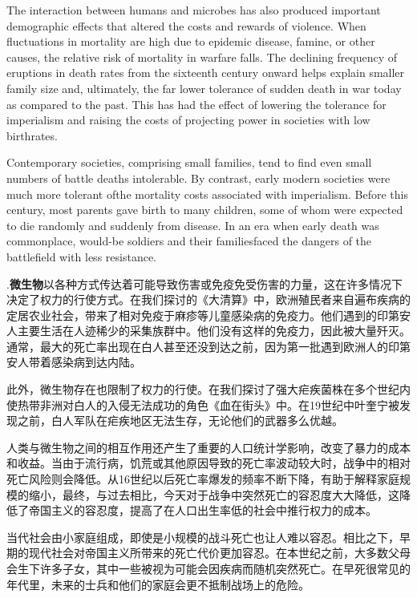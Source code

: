 \begin{paracol}{2}
The interaction between humans and microbes has also produced important demographic effects that altered the costs and rewards of violence. When fluctuations in mortality are high due to epidemic disease, famine, or other causes, the relative risk of mortality in warfare falls. The declining frequency of eruptions in death rates from the sixteenth century onward helps explain smaller family size and, ultimately, the far lower tolerance of sudden death in war today as compared to the past. This has had the effect of lowering the tolerance for imperialism and raising the costs of projecting power in societies with low birthrates.

Contemporary societies, comprising small families, tend to find even small numbers of battle deaths intolerable. By contrast, early modern societies were much more tolerant ofthe mortality costs associated with imperialism. Before this century, most parents gave birth to many children, some of whom were expected to die randomly and suddenly from disease. In an era when early death was commonplace, would-be soldiers and their familiesfaced the dangers of the battlefield with less resistance.

.\textbf{微生物}以各种方式传达着可能导致伤害或免疫免受伤害的力量，这在许多情况下决定了权力的行使方式。在我们探讨的《大清算》中，欧洲殖民者来自遍布疾病的定居农业社会，带来了相对免疫于麻疹等儿童感染病的免疫力。他们遇到的印第安人主要生活在人迹稀少的采集族群中。他们没有这样的免疫力，因此被大量歼灭。通常，最大的死亡率出现在白人甚至还没到达之前，因为第一批遇到欧洲人的印第安人带着感染病到达内陆。

此外，微生物存在也限制了权力的行使。在我们探讨了强大疟疾菌株在多个世纪内使热带非洲对白人的入侵无法成功的角色《血在街头》中。在19世纪中叶奎宁被发现之前，白人军队在疟疾地区无法生存，无论他们的武器多么优越。

人类与微生物之间的相互作用还产生了重要的人口统计学影响，改变了暴力的成本和收益。当由于流行病，饥荒或其他原因导致的死亡率波动较大时，战争中的相对死亡风险则会降低。从16世纪以后死亡率爆发的频率不断下降，有助于解释家庭规模的缩小，最终，与过去相比，今天对于战争中突然死亡的容忍度大大降低，这降低了帝国主义的容忍度，提高了在人口出生率低的社会中推行权力的成本。

当代社会由小家庭组成，即使是小规模的战斗死亡也让人难以容忍。相比之下，早期的现代社会对帝国主义所带来的死亡代价更加容忍。在本世纪之前，大多数父母会生下许多子女，其中一些被视为可能会因疾病而随机突然死亡。在早死很常见的年代里，未来的士兵和他们的家庭会更不抵制战场上的危险。


\end{paracol}
